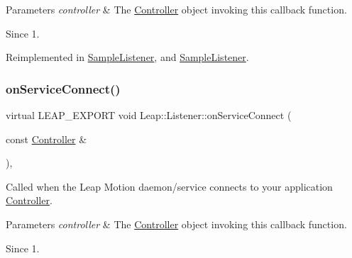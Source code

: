 \begin{DoxyCodeInclude}
\end{DoxyCodeInclude}



\begin{DoxyParams}{Parameters}
{\em controller} & The \hyperlink{class_leap_1_1_controller}{Controller} object invoking this callback function. \\
\hline
\end{DoxyParams}
\begin{DoxySince}{Since}
1. 
\end{DoxySince}


Reimplemented in \hyperlink{class_sample_listener_a8e28c251385c39ebd874f48396da7fb6}{Sample\+Listener}, and \hyperlink{class_sample_listener_ab2a418fbd9bd0da82f47e0e9b3149b38}{Sample\+Listener}.

\mbox{\label{class_leap_1_1_listener_aa9cc3f35ba72e58dc45cac415b9253f7}} 
\subsubsection{\texorpdfstring{on\+Service\+Connect()}{onServiceConnect()}}
{\footnotesize\ttfamily virtual L\+E\+A\+P\+\_\+\+E\+X\+P\+O\+RT void Leap\+::\+Listener\+::on\+Service\+Connect (\begin{DoxyParamCaption}\item[{const \hyperlink{class_leap_1_1_controller}{Controller} \&}]{ }\end{DoxyParamCaption})\hspace{0.3cm}{\ttfamily [inline]}, {\ttfamily [virtual]}}

Called when the Leap Motion daemon/service connects to your application \hyperlink{class_leap_1_1_controller}{Controller}.


\begin{DoxyCodeInclude}
\end{DoxyCodeInclude}



\begin{DoxyParams}{Parameters}
{\em controller} & The \hyperlink{class_leap_1_1_controller}{Controller} object invoking this callback function. \\
\hline
\end{DoxyParams}
\begin{DoxySince}{Since}
1. 
\end{DoxySince}


